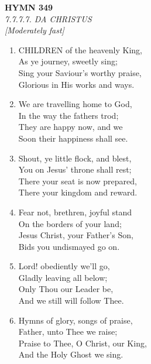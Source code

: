 \newpage
\begin{center}
    {\Large \textbf{HYMN 349}}
    \\
    \textit{7.7.7.7. DA CHRISTUS}
    \\
    \textit{\small [Moderately fast]}
\end{center}
\vspace{1em}

\begin{enumerate}
    \item CHILDREN of the heavenly King, \\
        As ye journey, sweetly sing; \\
        Sing your Saviour's worthy praise, \\
        Glorious in His works and ways.

    \item We are travelling home to God, \\
        In the way the fathers trod; \\
        They are happy now, and we \\
        Soon their happiness shall see.

    \item Shout, ye little flock, and blest, \\
        You on Jesus' throne shall rest; \\
        There your seat is now prepared, \\
        There your kingdom and reward.

    \item Fear not, brethren, joyful stand \\
        On the borders of your land; \\
        Jesus Christ, your Father's Son, \\
        Bids you undismayed go on.

    \item Lord! obediently we'll go, \\
        Gladly leaving all below; \\
        Only Thou our Leader be, \\
        And we still will follow Thee.

    \item Hymns of glory, songs of praise, \\
        Father, unto Thee we raise; \\
        Praise to Thee, O Christ, our King, \\
        And the Holy Ghost we sing.

\end{enumerate}

